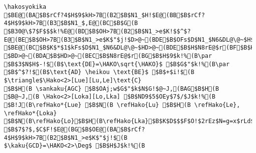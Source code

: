 \begin{verbatim}
\hakosyokika
$BE@(BA$B$rCf?4$H$9$kH>7B(B2$B$N1_$H!$E@(BB$B$rCf?4$H$9$kH>7B(B3$B$N1_$,E@(BC$B$G(B
$B30@\$7$F$$$k!%E@(BD$B$OH>7B(B2$B$N1_>e$K!$$^$?E@(BE$B$OH>7B(B3$B$N1_>e$K$"$j!$D>@~(BDE$B$OFs$D$N1_$N6&DL@\@~$H$J$C$F$$$k!%(B
$BE@(BC$B$K$*$1$kFs$D$N1_$N6&DL@\@~$HD>@~(BDE$B$H$N8rE@$r(BF$B$H$7!$(B
$BD>@~(BDA$B$HD>@~(BEC$B$N8rE@$r(BG$B$H$9$k!%(B\par
$B$3$N$H$-!$(B$\text{DE}=\HAKO\sqrt{\HAKO}$ $B$G$"$k!%(B\par
$B$^$?!$(B$\text{AD} \heikou \text{BE}$ $B$+$i!$(B
$\triangle$\Hako<2>[Lue][Lu,Le]\text{C}
$B$H(B \sankaku{AGC} $B$OAj;w$G$"$k$N$G!$@~J,(BAG$B$H(B
$B@~J,(B \Hako<2>[Loka][Lo,Lka] $B$ND9$5$OEy$7$/$J$k!%(B
$B!J(B\refHako*{Lue} $B$N(B \refHako{Lu} $B$H(B \refHako{Le}, 
\refHako*{Loka} $B$N(B\refHako{Lo}$B$H(B\refHako{Lka}$B$K$D$$$F$O!$2rEz$N=g=x$rLd$o$J$$!%!K(B\par
$B$7$?$,$C$F!$E@(BG$B$OE@(BA$B$rCf?4$H$9$kH>7B(B2$B$N1_>e$K$"$j!$(B
$\kaku{GCD}=\HAKO<2>\Deg$ $B$H$J$k!%(B
\end{verbatim}
